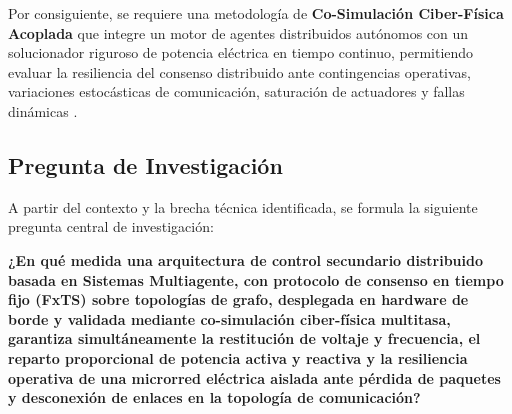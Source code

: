 Por consiguiente, se requiere una metodología de \textbf{Co-Simulación Ciber-Física Acoplada} \citep{Gomes2022FMI30} que integre un motor de agentes distribuidos autónomos con un solucionador riguroso de potencia eléctrica en tiempo continuo, permitiendo evaluar la resiliencia del consenso distribuido ante contingencias operativas, variaciones estocásticas de comunicación, saturación de actuadores y fallas dinámicas \citep{Barzegari2022Resilient}.

\subsection{Pregunta de Investigación}
A partir del contexto y la brecha técnica identificada, se formula la siguiente pregunta central de investigación:

\textbf{¿En qué medida una arquitectura de control secundario distribuido basada en Sistemas Multiagente, con protocolo de consenso en tiempo fijo (FxTS) sobre topologías de grafo, desplegada en hardware de borde y validada mediante co-simulación ciber-física multitasa, garantiza simultáneamente la restitución de voltaje y frecuencia, el reparto proporcional de potencia activa y reactiva y la resiliencia operativa de una microrred eléctrica aislada ante pérdida de paquetes y desconexión de enlaces en la topología de comunicación?}